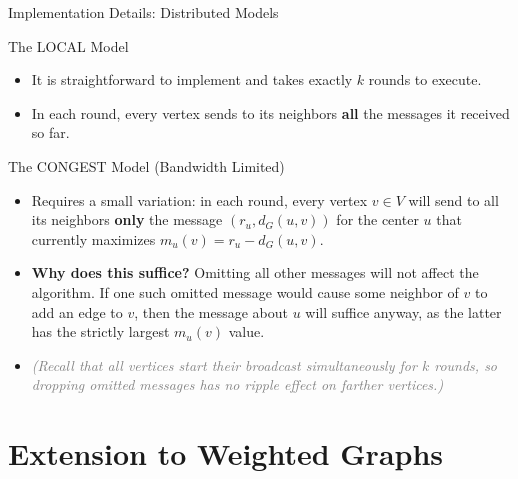 \documentclass{beamer}
\begin{document}
\begin{frame}{Implementation Details: Distributed Models}
    \vspace{-0.1cm}
    \begin{block}{The LOCAL Model}
        \small
        \begin{itemize}
            \item It is straightforward to implement and takes exactly $k$ rounds to execute.
            \item In each round, every vertex sends to its neighbors \textbf{all} the messages it received so far.
        \end{itemize}
    \end{block}
    
    \vspace{0.1cm}
    \begin{block}{The CONGEST Model (Bandwidth Limited)}
        \small
        \begin{itemize}
            \item Requires a small variation: in each round, every vertex $v \in V$ will send to all its neighbors \textbf{only} the message $(r_u, d_G(u,v))$ for the center $u$ that currently maximizes $m_u(v) = r_u - d_G(u,v)$.
            \item \textbf{Why does this suffice?} Omitting all other messages will not affect the algorithm. If one such omitted message would cause some neighbor of $v$ to add an edge to $v$, then the message about $u$ will suffice anyway, as the latter has the strictly largest $m_u(v)$ value.
            \item \textcolor{gray}{\scriptsize \textit{(Recall that all vertices start their broadcast simultaneously for $k$ rounds, so dropping omitted messages has no ripple effect on farther vertices.)}}
        \end{itemize}
    \end{block}
\end{frame}

\section{Extension to Weighted Graphs}
\end{document}
